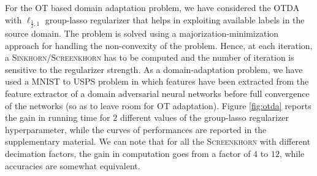 For the OT based domain adaptation problem, we have considered the
OTDA with $\ell_{\frac 12,1}$ group-lasso regularizer that helps in exploiting available labels in the source domain. The problem is solved using a majorization-minimization approach 
for handling the non-convexity of the problem. Hence, at each iteration, a \textsc{Sinkhorn}/\textsc{Screenkhorn} has to be computed and the number of iteration is
sensitive to the regularizer strength.  As a domain-adaptation problem, we have
used a MNIST to USPS problem in which features have been extracted from the
feature extractor of a domain adversarial neural networks \citep{ganin2016domain} before full convergence of the networks (so as to leave room for OT adaptation). 
Figure \ref{fig:otda} reports the gain in running time for $2$ different values
of the group-lasso regularizer hyperparameter, while the curves of performances are
reported in the supplementary material. We can note that for all the  \textsc{Screenkhorn} with different decimation factors, the gain in computation goes from a factor of $4$ to $12$, while accuracies are somewhat equivalent.

